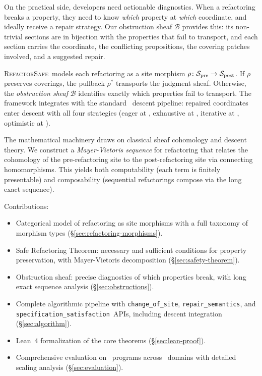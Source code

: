 \documentclass[11pt]{article}
\newcommand{\RefactorSafe}{\textsc{RefactorSafe}}
\newcommand{\ChangeOfSite}{\texttt{change\_of\_site}}
\newcommand{\RepairSem}{\texttt{repair\_semantics}}
\newcommand{\SpecSat}{\texttt{specification\_satisfaction}}
\newcommand{\SitePre}{\Site_{\mathrm{pre}}}
\newcommand{\SitePost}{\Site_{\mathrm{post}}}
\newcommand{\RefactorMorph}{\rho}
\newcommand{\ObstructionSheaf}{\mathcal{B}}
\begin{document}
On the practical side, developers need actionable diagnostics.  When a
refactoring breaks a property, they need to know \emph{which} property
at \emph{which} coordinate, and ideally receive a repair strategy.
Our obstruction sheaf $\ObstructionSheaf$ provides this: its non-trivial
sections are in bijection with the properties that fail to transport,
and each section carries the coordinate, the conflicting propositions,
the covering patches involved, and a suggested repair.

\RefactorSafe\ models each refactoring as a site morphism
$\RefactorMorph \colon \SitePre \to \SitePost$.  If $\RefactorMorph$
preserves coverings, the pullback $\RefactorMorph^{*}$ transports the
judgment sheaf.  Otherwise, the \emph{obstruction sheaf}
$\ObstructionSheaf$ identifies exactly which properties fail to
transport.  The framework integrates with the standard \JuGeo\ descent
pipeline: repaired coordinates enter descent with all four strategies
(eager at \compDescentEagerRate, exhaustive at
\compDescentExhaustiveRate, iterative at \compDescentIterativeRate,
optimistic at \compDescentOptimisticRate).

The mathematical machinery draws on classical sheaf cohomology and
descent theory.  We construct a \emph{Mayer-Vietoris sequence} for
refactoring that relates the cohomology of the pre-refactoring site to
the post-refactoring site via connecting homomorphisms.  This yields
both computability (each term is finitely presentable) and composability
(sequential refactorings compose via the long exact sequence).

Contributions:
\begin{itemize}[noitemsep]
  \item Categorical model of refactoring as site morphisms with a
        full taxonomy of morphism types
        (§\ref{sec:refactoring-morphisms}).
  \item Safe Refactoring Theorem: necessary and sufficient conditions
        for property preservation, with Mayer-Vietoris decomposition
        (§\ref{sec:safety-theorem}).
  \item Obstruction sheaf: precise diagnostics of which properties
        break, with long exact sequence analysis
        (§\ref{sec:obstructions}).
  \item Complete algorithmic pipeline with \ChangeOfSite, \RepairSem,
        and \SpecSat\ APIs, including descent integration
        (§\ref{sec:algorithm}).
  \item Lean~4 formalization of the core theorems
        (§\ref{sec:lean-proof}).
  \item Comprehensive evaluation on \compTotalPrograms\ programs across
        \expDomainCount\ domains with detailed scaling analysis
        (§\ref{sec:evaluation}).
\end{itemize}
\end{document}
